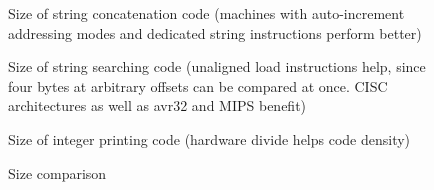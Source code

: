 \documentclass{article}[10pt]
\begin{document}
\begin{figure}[tbp]
\begin{center}
\end{center}
\caption{Size of string concatenation code (machines with 
auto-increment addressing modes and dedicated
string instructions perform better)}
\label{figure:strcat}
\end{figure}

\begin{figure}[tbp]
\begin{center}
\end{center}
\caption{Size of string searching code (unaligned load
instructions help, since four bytes at arbitrary offsets 
can be compared at once.  CISC architectures as well as avr32 and MIPS
benefit)
}
\label{figure:findstring}
\end{figure}

\begin{figure}[tbp]
\begin{center}
\end{center}
\caption{Size of integer printing code (hardware
divide helps code density)}
\label{figure:numascii}
\end{figure}

\begin{figure}[tbp]
\begin{center}
\end{center}
\caption{Size comparison}
\label{figure:libc}
\end{figure}
\end{document}
